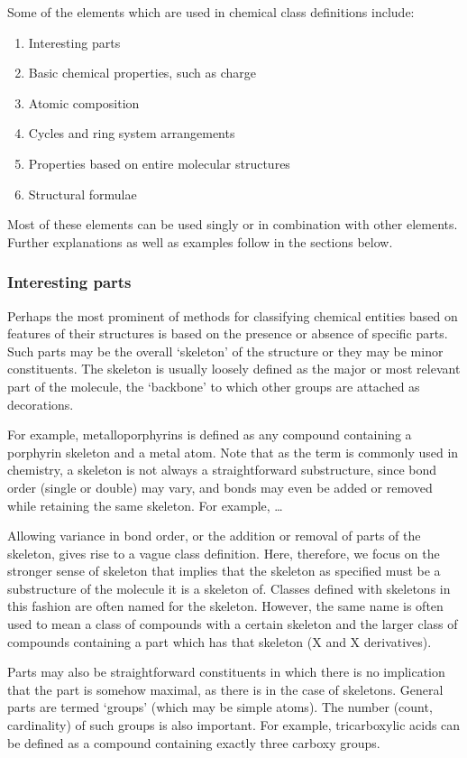 \documentclass[10pt]{bmc_article}
\newenvironment{bmcformat}{\baselineskip20pt\sloppy\setboolean{publ}{false}}{\baselineskip20pt\sloppy}
\begin{document}
\begin{bmcformat}
Some of the elements which are used in chemical class definitions include: 
\begin{enumerate}
	\item	Interesting parts
	\item	Basic chemical properties, such as charge
	\item	Atomic composition
	\item	Cycles and ring system arrangements
	\item	Properties based on entire molecular structures
	\item	Structural formulae
\end{enumerate}

Most of these elements can be used singly or in combination with other elements.  Further explanations as well as examples follow in the sections below. 


\subsubsection*{Interesting parts}

Perhaps the most prominent of methods for classifying chemical entities based on features of their structures is based on the presence or absence of specific parts.  Such parts may be the overall `skeleton' of the structure or they may be minor constituents. The skeleton is usually loosely defined as the major or most relevant part of the molecule, the `backbone' to which other groups are attached as decorations. 

For example, metalloporphyrins is defined as any compound containing a porphyrin skeleton and a metal atom.  Note that as the term is commonly used in chemistry, a skeleton is not always a straightforward substructure, since bond order (single or double) may vary, and bonds may even be added or removed while retaining the same skeleton. For example, \ldots
 
Allowing variance in bond order, or the addition or removal of parts of the skeleton, gives rise to a vague class definition. Here, therefore, we focus on the stronger sense of skeleton that implies that the skeleton as specified must be a substructure of the molecule it is a skeleton of. Classes defined with skeletons in this fashion are often named for the skeleton.  However, the same name is often used to mean a class of compounds with a certain skeleton and the larger class of compounds containing a part which has that skeleton (X and X derivatives). 

Parts may also be straightforward constituents in which there is no implication that the part is somehow maximal, as there is in the case of skeletons.  General parts are termed `groups' (which may be simple atoms). The number (count, cardinality) of such groups is also important.  For example, tricarboxylic acids can be defined as a compound containing exactly three carboxy groups. 


\end{bmcformat}
\end{document}
